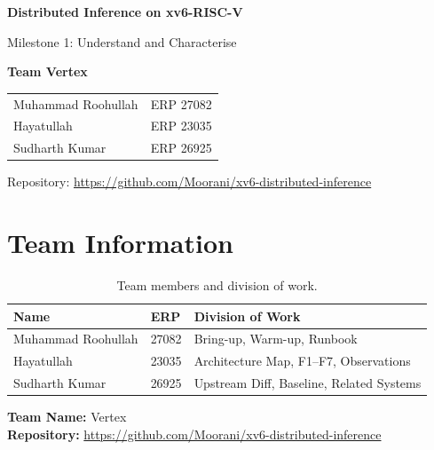 \documentclass[11pt,a4paper]{article}
\begin{document}
\begin{titlepage}
\centering
\vspace*{2cm}
{\Huge\bfseries Distributed Inference on xv6-RISC-V\par}
\vspace{0.5cm}
{\Large Milestone 1: Understand and Characterise\par}
\vspace{2cm}
{\large\bfseries Team Vertex\par}
\vspace{0.5cm}
\begin{tabular}{ll}
Muhammad Roohullah & ERP 27082 \\
Hayatullah        & ERP 23035 \\
Sudharth Kumar    & ERP 26925 \\
\end{tabular}
\vspace{2cm}

{\large Repository: \url{https://github.com/Moorani/xv6-distributed-inference}\par}
\vspace{1cm}
\vfill
\end{titlepage}

\tableofcontents
\newpage

\section{Team Information}

\begin{table}[H]
\centering
\begin{tabular}{lll}
\toprule
\textbf{Name} & \textbf{ERP} & \textbf{Division of Work} \\
\midrule
Muhammad Roohullah & 27082 & Bring-up, Warm-up, Runbook \\
Hayatullah        & 23035 & Architecture Map, F1--F7, Observations \\
Sudharth Kumar    & 26925 & Upstream Diff, Baseline, Related Systems \\
\bottomrule
\end{tabular}
\caption{Team members and division of work.}
\end{table}

\noindent\textbf{Team Name:} Vertex \\
\noindent\textbf{Repository:} \url{https://github.com/Moorani/xv6-distributed-inference}
\end{document}
